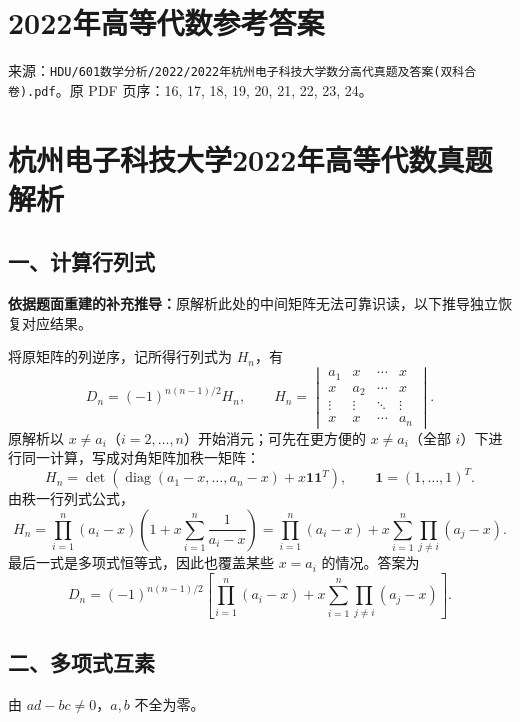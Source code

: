 \documentclass[11pt,fontset=fandol]{ctexart}
\begin{document}
\section{2022年高等代数参考答案}\label{ux5e74ux9ad8ux7b49ux4ee3ux6570ux53c2ux8003ux7b54ux6848}

来源：\texttt{HDU/601数学分析/2022/2022年杭州电子科技大学数分高代真题及答案(双科合卷).pdf}。原
PDF 页序：16, 17, 18, 19, 20, 21, 22, 23, 24。

\section{杭州电子科技大学2022年高等代数真题解析}\label{ux676dux5ddeux7535ux5b50ux79d1ux6280ux5927ux5b662022ux5e74ux9ad8ux7b49ux4ee3ux6570ux771fux9898ux89e3ux6790}

\subsection{一、计算行列式}\label{ux4e00ux8ba1ux7b97ux884cux5217ux5f0f}

\textbf{依据题面重建的补充推导：}原解析此处的中间矩阵无法可靠识读，以下推导独立恢复对应结果。

将原矩阵的列逆序，记所得行列式为 \(H_n\)，有 \[
D_n=(-1)^{n(n-1)/2}H_n,\qquad
H_n=\begin{vmatrix}
a_1&x&\cdots&x\\
x&a_2&\cdots&x\\
\vdots&\vdots&\ddots&\vdots\\
x&x&\cdots&a_n
\end{vmatrix}.
\] 原解析以 \(x\ne a_i\)（\(i=2,\ldots,n\)）开始消元；可先在更方便的
\(x\ne a_i\)（全部 \(i\)）下进行同一计算，写成对角矩阵加秩一矩阵： \[
H_n=\det\!\left(\operatorname{diag}(a_1-x,\ldots,a_n-x)
+x\boldsymbol1\boldsymbol1^T\right),\qquad
\boldsymbol1=(1,\ldots,1)^T.
\] 由秩一行列式公式， \[
H_n=\prod_{i=1}^n(a_i-x)\left(1+x\sum_{i=1}^n\frac1{a_i-x}\right)
=\prod_{i=1}^n(a_i-x)+x\sum_{i=1}^n\prod_{j\ne i}(a_j-x).
\] 最后一式是多项式恒等式，因此也覆盖某些 \(x=a_i\) 的情况。答案为 \[
\boxed{D_n=(-1)^{n(n-1)/2}\left[\prod_{i=1}^n(a_i-x)+x\sum_{i=1}^n\prod_{j\ne i}(a_j-x)\right]}.
\]

\subsection{二、多项式互素}\label{ux4e8cux591aux9879ux5f0fux4e92ux7d20}

由 \(ad-bc\ne0\)，\(a,b\) 不全为零。
\end{document}
